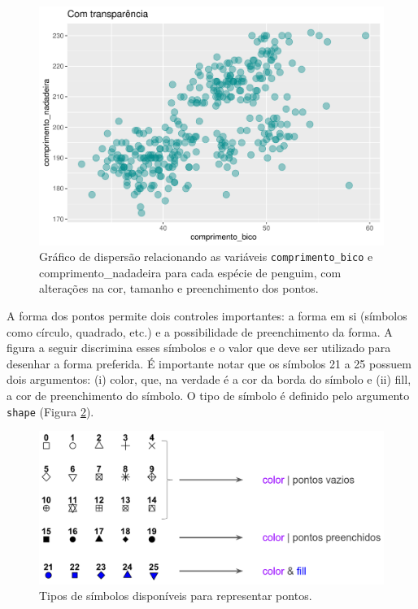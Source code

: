 \documentclass[
]{article}
\begin{document}
\begin{figure}
\centering
\includegraphics{epr_files/figure-latex/fig-scatter-col-2.pdf}
\caption{\label{fig:fig-scatter-col-2}Gráfico de dispersão relacionando as variáveis \texttt{comprimento\_bico} e comprimento\_nadadeira para cada espécie de penguim, com alterações na cor, tamanho e preenchimento dos pontos.}
\end{figure}

A forma dos pontos permite dois controles importantes: a forma em si (símbolos como círculo, quadrado, etc.) e a possibilidade de preenchimento da forma. A figura a seguir discrimina esses símbolos e o valor que deve ser utilizado para desenhar a forma preferida. É importante notar que os símbolos 21 a 25 possuem dois argumentos: (i) color, que, na verdade é a cor da borda do símbolo e (ii) fill, a cor de preenchimento do símbolo. O tipo de símbolo é definido pelo argumento \texttt{shape} (Figura \ref{fig:fig-point-shape}).

\begin{figure}

{\centering \includegraphics[width=0.5\linewidth]{figures/cap06_fig02} 

}

\caption{Tipos de símbolos disponíveis para representar pontos.}\label{fig:fig-point-shape}
\end{figure}
\end{document}
